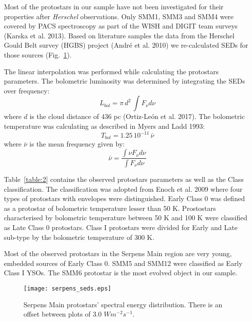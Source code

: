 \documentclass{aa}
\begin{document}
Most of the protostars in our sample have not been investigated for their properties after \textit{Herschel} observations. Only SMM1, SMM3 and SMM4 were covered by PACS spectroscopy as part of the WISH and DIGIT team surveys (Karska et al. 2013). Based on literature samples the data from the Herschel Gould Belt survey (HGBS) project (André et al. 2010) we re-calculated SEDs for those sources (Fig.~\ref{seds}).

The linear interpolation was performed while calculating the protostars parameters. The bolometric luminosity was determined by integrating the SEDs over frequency:
\begin{equation} \label{eq1}
L_{bol} = \pi \, d^2 \, \int F_\nu d\nu
\end{equation}
where $d$ is the cloud distance of 436  pc (Ortiz-León et al. 2017).
The bolometric temperature was calculating as described in Myers and Ladd 1993:
\begin{equation} \label{eq2}
T_{bol} = 1.25 \, 10^{-11} \, \bar{\nu}
\end{equation}
where $\bar{\nu}$ is the mean frequency given by:
\begin{equation} \label{eq3}
\bar{\nu} = \frac{\int \nu F_\nu d\nu}{ \int F_\nu d\nu}
\end{equation}

Table~\ref{table:2} contains the observed protostars parameters as well as the Class classification. The classification was adopted from Enoch et al. 2009 where four types of protostars with envelopes were distinguished. Early Class 0 was defined as a protostar of bolometric temperature lesser than 50 K. Prostostars characterised by bolometric temperature between 50 K and 100 K were classified as Late Class 0 protostars. Class I protostars were divided for Early and Late sub-type by the bolometric temperature of 300 K.

Most of the observed protostars in the Serpens Main region are very young, embedded sources of Early Class 0. SMM5 and SMM12 were classified as Early Class I YSOs. The SMM6 protostar is the most evolved object in our sample. 

\begin{figure}
   \texttt{[image: serpens\_seds.eps]}
      \caption{Serpens Main protostars' spectral energy distribution. There is an offset between plots of 3.0 $W m^{-2} s^{-1}$.}
         \label{seds}
   \end{figure}
\end{document}
